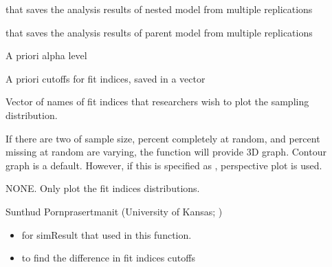 \documentclass[a4paper]{book}
\begin{document}
%
\begin{Arguments}
\begin{ldescription}
\item[\code{nested}] 
 that saves the analysis results of nested model from multiple replications

\item[\code{parent}] 
 that saves the analysis results of parent model from multiple replications

\item[\code{alpha}] 
A priori alpha level

\item[\code{cutoff}] 
A priori cutoffs for fit indices, saved in a vector

\item[\code{usedFit}] 
Vector of names of fit indices that researchers wish to plot the sampling distribution. 

\item[\code{useContour}] 
If there are two of sample size, percent completely at random, and percent missing at random are varying, the  function will provide 3D graph. Contour graph is a default. However, if this is specified as , perspective plot is used.

\end{ldescription}
\end{Arguments}
%
\begin{Value}
NONE. Only plot the fit indices distributions.
\end{Value}
%
\begin{Author}\relax
Sunthud Pornprasertmanit (University of Kansas; )
\end{Author}
%
\begin{SeeAlso}\relax
\begin{itemize}

\item {} for simResult that used in this function.
\item {} to find the difference in fit indices cutoffs

\end{itemize}

\end{SeeAlso}
%
\end{document}
